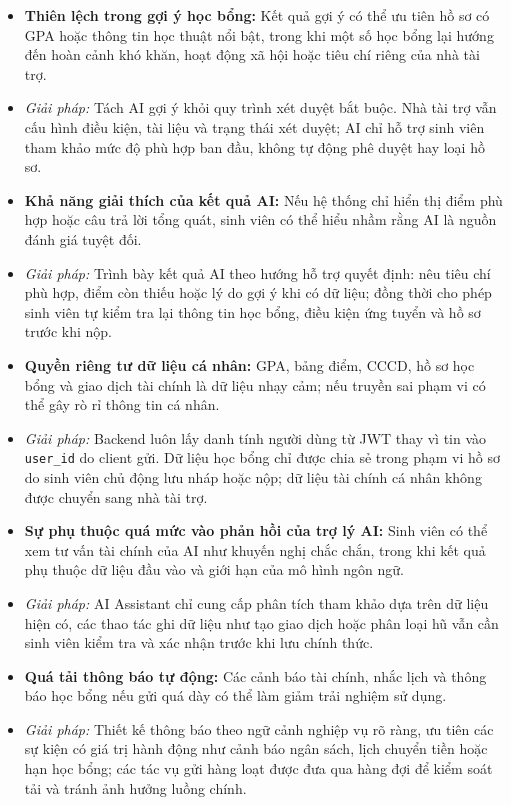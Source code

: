 \begin{itemize}
    \item \textbf{Thiên lệch trong gợi ý học bổng:} Kết quả gợi ý có thể ưu tiên hồ sơ có GPA hoặc thông tin học thuật nổi bật, trong khi một số học bổng lại hướng đến hoàn cảnh khó khăn, hoạt động xã hội hoặc tiêu chí riêng của nhà tài trợ.
    \item \textit{Giải pháp:} Tách AI gợi ý khỏi quy trình xét duyệt bắt buộc. Nhà tài trợ vẫn cấu hình điều kiện, tài liệu và trạng thái xét duyệt; AI chỉ hỗ trợ sinh viên tham khảo mức độ phù hợp ban đầu, không tự động phê duyệt hay loại hồ sơ.

    \item \textbf{Khả năng giải thích của kết quả AI:} Nếu hệ thống chỉ hiển thị điểm phù hợp hoặc câu trả lời tổng quát, sinh viên có thể hiểu nhầm rằng AI là nguồn đánh giá tuyệt đối.
    \item \textit{Giải pháp:} Trình bày kết quả AI theo hướng hỗ trợ quyết định: nêu tiêu chí phù hợp, điểm còn thiếu hoặc lý do gợi ý khi có dữ liệu; đồng thời cho phép sinh viên tự kiểm tra lại thông tin học bổng, điều kiện ứng tuyển và hồ sơ trước khi nộp.

    \item \textbf{Quyền riêng tư dữ liệu cá nhân:} GPA, bảng điểm, CCCD, hồ sơ học bổng và giao dịch tài chính là dữ liệu nhạy cảm; nếu truyền sai phạm vi có thể gây rò rỉ thông tin cá nhân.
    \item \textit{Giải pháp:} Backend luôn lấy danh tính người dùng từ JWT thay vì tin vào \texttt{user\_id} do client gửi. Dữ liệu học bổng chỉ được chia sẻ trong phạm vi hồ sơ do sinh viên chủ động lưu nháp hoặc nộp; dữ liệu tài chính cá nhân không được chuyển sang nhà tài trợ.

    \item \textbf{Sự phụ thuộc quá mức vào phản hồi của trợ lý AI:} Sinh viên có thể xem tư vấn tài chính của AI như khuyến nghị chắc chắn, trong khi kết quả phụ thuộc dữ liệu đầu vào và giới hạn của mô hình ngôn ngữ.
    \item \textit{Giải pháp:} AI Assistant chỉ cung cấp phân tích tham khảo dựa trên dữ liệu hiện có, các thao tác ghi dữ liệu như tạo giao dịch hoặc phân loại hũ vẫn cần sinh viên kiểm tra và xác nhận trước khi lưu chính thức.

    \item \textbf{Quá tải thông báo tự động:} Các cảnh báo tài chính, nhắc lịch và thông báo học bổng nếu gửi quá dày có thể làm giảm trải nghiệm sử dụng.
    \item \textit{Giải pháp:} Thiết kế thông báo theo ngữ cảnh nghiệp vụ rõ ràng, ưu tiên các sự kiện có giá trị hành động như cảnh báo ngân sách, lịch chuyển tiền hoặc hạn học bổng; các tác vụ gửi hàng loạt được đưa qua hàng đợi để kiểm soát tải và tránh ảnh hưởng luồng chính.
\end{itemize}

